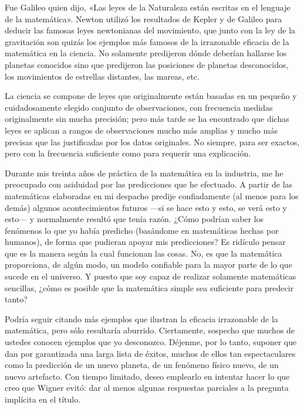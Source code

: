 \documentclass[a4paper, 12pt]{article}
\begin{document}
 

Fue Galileo quien dijo, «Las leyes de la Naturaleza están escritas en el lenguaje de la matemática». Newton utilizó los resultados de Kepler y de Galileo para deducir las famosas leyes newtonianas del movimiento, que junto con la ley de la gravitación son quizás los ejemplos más famosos de la irrazonable eficacia de la matemática en la ciencia. No solamente predijeron dónde deberían hallarse los planetas conocidos sino que predijeron las posiciones de planetas desconocidos, los movimientos de estrellas distantes, las mareas, etc.

 

La ciencia se compone de leyes que originalmente están basadas en un pequeño y cuidadosamente elegido conjunto de observaciones, con frecuencia medidas originalmente sin mucha precisión; pero más tarde se ha encontrado que dichas leyes se aplican a rangos de observaciones mucho más amplias y mucho más precisas que las justificadas por los datos originales. No siempre, para ser exactos, pero con la frecuencia suficiente como para requerir una explicación.



Durante mis treinta años de práctica de la matemática en la industria, me he preocupado con asiduidad por las predicciones que he efectuado. A partir de las matemáticas elaboradas en mi despacho predije confiadamente (al menos para los demás) algunos acontecimientos futuros ---si se hace esto y esto, se verá esto y esto--- y normalmente resultó que tenía razón. ¿Cómo podrían saber los fenómenos lo que yo había predicho (basándome en matemáticas hechas por humanos), de forma que pudieran apoyar mis predicciones? Es ridículo pensar que es la manera según la cual funcionan las cosas. No, es que la matemática proporciona, de algún modo, un modelo confiable para la mayor parte de lo que sucede en el universo. Y puesto que soy capaz de realizar solamente matemáticas sencillas, ¿cómo es posible que la matemática simple sea suficiente para predecir tanto?



Podría seguir citando más ejemplos que ilustran la eficacia irrazonable de la matemática, pero sólo resultaría aburrido. Ciertamente, sospecho que muchos de ustedes conocen ejemplos que yo desconozco. Déjenme, por lo tanto, suponer que dan por garantizada una larga lista de éxitos, muchos de ellos tan espectaculares como la predicción de un nuevo planeta, de un fenómeno físico nuevo, de un nuevo artefacto. Con tiempo limitado, deseo emplearlo en intentar hacer lo que creo que Wigner evitó: dar al menos algunas respuestas parciales a la pregunta implícita en el título.  
\end{document}
